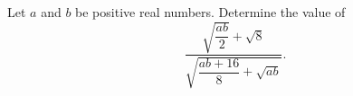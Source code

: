 Let $a$ and $b$ be positive real numbers. Determine the value of
\[
\dfrac{\sqrt{\dfrac{ab}{2}}+\sqrt8}{\sqrt{\dfrac{ab+16}{8}+\sqrt{ab}}} .
\]
